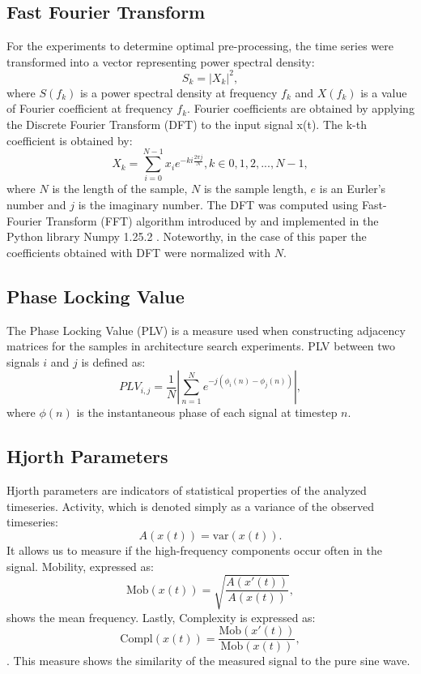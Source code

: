 \documentclass[a4paper,fleqn]{cas-sc}
\begin{document}
\subsection{Fast Fourier Transform}
For the experiments to determine optimal pre-processing, the time series were transformed into a vector representing power spectral density:
\begin{equation}
    S_k= |X_k|^{2},
\end{equation}
where $S(f_k)$ is a power spectral density at frequency $f_k$ and $X(f_k)$ is a value of
Fourier coefficient at frequency $f_k$. Fourier coefficients are obtained by applying the Discrete Fourier Transform (DFT) to the input signal x(t). The k-th coefficient is obtained by:
\begin{equation}
    X_k = \sum_{i=0}^{N-1}x_i e^{-ki\frac{2\pi j}{N}}, k \in {0,1,2, ..., N-1},
\end{equation}
where $N$ is the length of the sample, $N$ is the sample length, $e$ is an Eurler's number and $j$ is the imaginary number.
The DFT was computed using Fast-Fourier Transform (FFT) algorithm introduced by \cite{Cooley1965FFT} and
implemented in the Python library Numpy 1.25.2 \cite{harris2020numpy}. Noteworthy, in the case of this paper the coefficients obtained with DFT were normalized with $N$.
\subsection{Phase Locking Value}
The Phase Locking Value (PLV) \cite{bruna2018plv} is a measure used when constructing adjacency matrices for the samples in architecture search experiments. PLV between two signals $i$ and $j$ is defined as:
\begin{equation}
    PLV_{i,j} = \frac{1}{N}|\sum_{n=1}^{N}{e^{-j(\phi_i(n)-\phi_j(n))}}|,
\end{equation}
where $\phi(n)$ is the instantaneous phase of each signal at timestep $n$.
\subsection{Hjorth Parameters}
Hjorth parameters \cite{hjorth1970params} are indicators of statistical properties of the analyzed timeseries. Activity, which is denoted simply as a variance of the observed timeseries:
\begin{equation}
    A(x(t)) = \text{var}(x(t)).
\end{equation}
It allows us to measure if the high-frequency components occur often in the signal.
Mobility, expressed as:
\begin{equation}
    \text{Mob}(x(t)) = \sqrt{\frac{A(x'(t))}{A(x(t))}},
\end{equation}
shows the mean frequency. Lastly, Complexity is expressed as:
\begin{equation}
    \text{Compl}(x(t))=\frac{\text{Mob}(x'(t))}{\text{Mob}(x(t))},
\end{equation}.
This measure shows the similarity of the measured signal to the pure sine wave.
\end{document}
